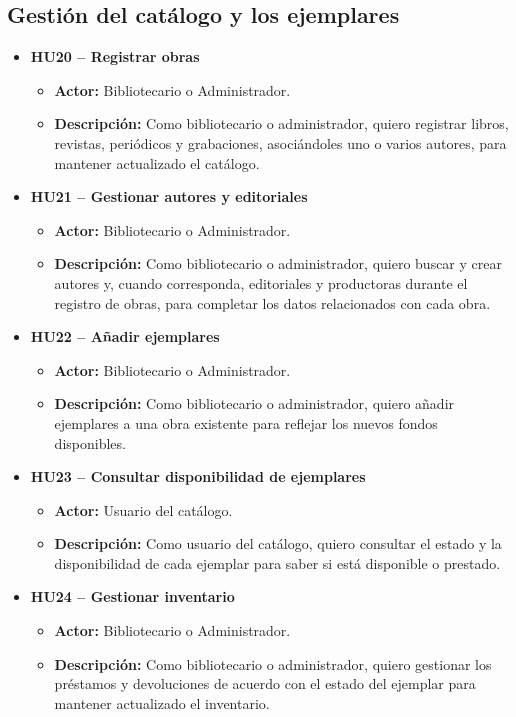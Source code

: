 \subsection{Gestión del catálogo y los ejemplares}
\begin{itemize}
	\item \textbf{HU20 -- Registrar obras}
	\begin{itemize}
		\item \textbf{Actor:} Bibliotecario o Administrador.
		\item \textbf{Descripción:} Como bibliotecario o administrador, quiero registrar libros, revistas, periódicos y grabaciones, asociándoles uno o varios autores, para mantener actualizado el catálogo.
	\end{itemize}
	
	\item \textbf{HU21 -- Gestionar autores y editoriales}
	\begin{itemize}
		\item \textbf{Actor:} Bibliotecario o Administrador.
		\item \textbf{Descripción:} Como bibliotecario o administrador, quiero buscar y crear autores y, cuando corresponda, editoriales y productoras durante el registro de obras, para completar los datos relacionados con cada obra.
	\end{itemize}
	
	\item \textbf{HU22 -- Añadir ejemplares}
	\begin{itemize}
		\item \textbf{Actor:} Bibliotecario o Administrador.
		\item \textbf{Descripción:} Como bibliotecario o administrador, quiero añadir ejemplares a una obra existente para reflejar los nuevos fondos disponibles.
	\end{itemize}
	
	\item \textbf{HU23 -- Consultar disponibilidad de ejemplares}
	\begin{itemize}
		\item \textbf{Actor:} Usuario del catálogo.
		\item \textbf{Descripción:} Como usuario del catálogo, quiero consultar el estado y la disponibilidad de cada ejemplar para saber si está disponible o prestado.
	\end{itemize}
	
	\item \textbf{HU24 -- Gestionar inventario}
	\begin{itemize}
		\item \textbf{Actor:} Bibliotecario o Administrador.
		\item \textbf{Descripción:} Como bibliotecario o administrador, quiero gestionar los préstamos y devoluciones de acuerdo con el estado del ejemplar para mantener actualizado el inventario.
	\end{itemize}
\end{itemize}

